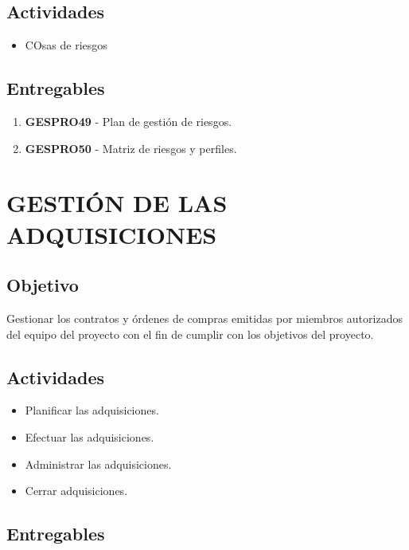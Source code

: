 \section{Actividades}
\begin{itemize}
	\item COsas de riesgos
\end{itemize}

\section{Entregables}

\begin{enumerate}
	\item \textbf{GESPRO49} - Plan de gesti\'on de riesgos.
	\item \textbf{GESPRO50} - Matriz de riesgos y perfiles.
\end{enumerate}

\chapter{GESTI\'ON DE LAS ADQUISICIONES}

\section{Objetivo}
Gestionar los contratos y \'ordenes de compras emitidas por miembros autorizados del equipo del proyecto con el fin
de cumplir con los objetivos del proyecto.

\section{Actividades}
\begin{itemize}
	\item Planificar las adquisiciones.
	
	\item Efectuar las adquisiciones.
	
	\item Administrar las adquisiciones.
	
	\item Cerrar adquisiciones.
\end{itemize}

\section{Entregables}

